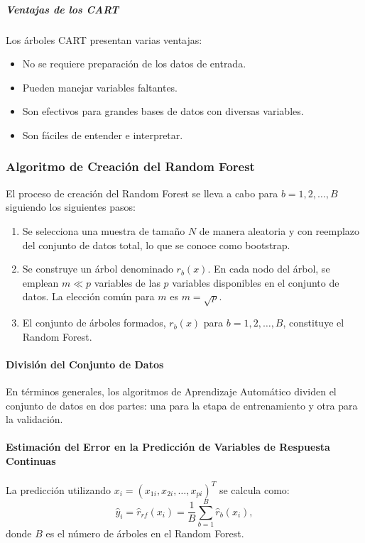 \subparagraph{Ventajas de los CART}
Los árboles CART presentan varias ventajas:
\begin{itemize}
	\item No se requiere preparación de los datos de entrada.
	\item Pueden manejar variables faltantes.
	\item Son efectivos para grandes bases de datos con diversas variables.
	\item Son fáciles de entender e interpretar.
\end{itemize}

\subsubsection{Algoritmo de Creación del Random Forest}\label{sec:algoritmo-creacion-rf}

El proceso de creación del Random Forest se lleva a cabo para \(b = 1,2, \ldots, B\) siguiendo los siguientes pasos:
\begin{enumerate}
  \item Se selecciona una muestra de tamaño \(N\) de manera aleatoria y con reemplazo del conjunto de datos total, lo que se conoce como bootstrap.
  \item Se construye un árbol denominado \(r_b(x)\). En cada nodo del árbol, se emplean \(m \ll p\) variables de las \(p\) variables disponibles en el conjunto de datos. La elección común para \(m\) es \(m = \sqrt{p}\).
  \item El conjunto de árboles formados, \(r_b(x)\) para \(b = 1,2, \ldots, B\), constituye el Random Forest.
\end{enumerate}

\paragraph{División del Conjunto de Datos}

En términos generales, los algoritmos de Aprendizaje Automático dividen el conjunto de datos en dos partes: una para la etapa de entrenamiento y otra para la validación.

\paragraph{Estimación del Error en la Predicción de Variables de Respuesta Continuas}

La predicción utilizando \(x_i = (x_{1i}, x_{2i}, \ldots, x_{pi})^T\) se calcula como:
\[ \hat{y}_i = \hat{r}_{rf}(x_i) = \frac{1}{B} \sum_{b=1}^{B} \hat{r}_b(x_i),\]
donde \(B\) es el número de árboles en el Random Forest.

